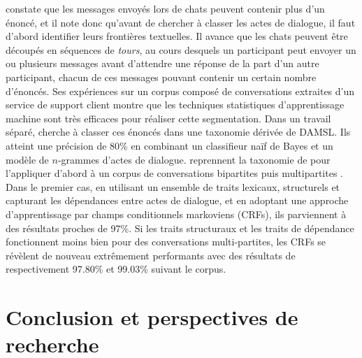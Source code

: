 \documentclass[10pt,a4paper,twoside]{article}
\begin{document}
\citet{ivanovic2005automatic} constate que les messages envoyés lors de chats peuvent contenir plus d'un énoncé, et il note donc qu'avant de chercher à classer les actes de dialogue, il faut d'abord identifier leurs frontières textuelles. Il avance que les chats peuvent être découpés en séquences de \textit{tours}, au cours desquels un participant peut envoyer un ou plusieurs messages avant d'attendre une réponse de la part d'un autre participant, chacun de ces messages pouvant contenir un certain nombre d'énoncés. Ses expériences sur un corpus composé de conversations extraites d'un service de support client montre que les techniques statistiques d'apprentissage machine sont très efficaces pour réaliser cette segmentation. Dans un travail séparé, \citet{ivanovic2005dialogue} cherche à classer ces énoncés dans une taxonomie dérivée de DAMSL. Ils atteint une précision de 80\% en combinant un classifieur naïf de Bayes et un modèle de $n$-grammes d'actes de dialogue. \citeauthor{kim2012classifying} reprennent la taxonomie de \citeauthor{ivanovic2005dialogue} pour l'appliquer d'abord à un corpus de conversations bipartites \cite{kim2010classifying} puis multipartites \cite{kim2012classifying}. Dans le premier cas, en utilisant un ensemble de traits lexicaux, structurels et capturant les dépendances entre actes de dialogue, et en adoptant une approche d'apprentissage par champs conditionnels markoviens (CRFs), ils parviennent à des résultats proches de 97\%. Si les traits structuraux et les traits de dépendance fonctionnent moins bien pour des conversations multi-partites, les CRFs se révèlent de nouveau extrêmement performants avec des résultats de respectivement 97.80\% et 99.03\% suivant le corpus.

\section{Conclusion et perspectives de recherche}
\label{sec:conclusion_and_research_perspectives}
\end{document}

